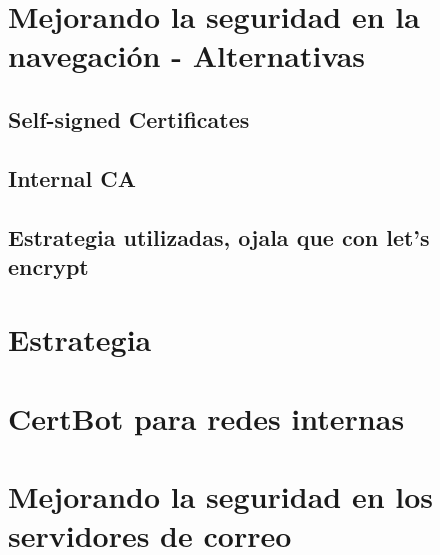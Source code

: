 






\section{Mejorando la seguridad en la navegación - Alternativas}

\subsection{Self-signed Certificates}
\subsection{Internal CA}
\subsection{Estrategia utilizadas, ojala que con let's encrypt}

\section{Estrategia}
\section{CertBot para redes internas}
\section{Mejorando la seguridad en los servidores de correo}

